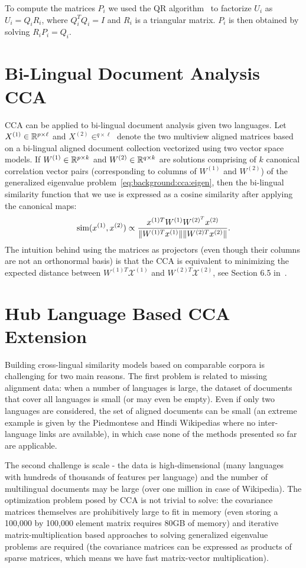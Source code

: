 To compute the matrices $P_i$ we used the QR algorithm~\cite{golub} to factorize
$U_i$ as $U_i = Q_i R_i$, where $Q_i^TQ_i = I$ and $R_i$ is a triangular matrix.
$P_i$ is then obtained by solving $R_i P_i = Q_i$.

\section{Bi-Lingual Document Analysis CCA}\label{chap:crosslingual:CCA}
CCA can be applied to bi-lingual document analysis given two languages. Let $X^{(1)} \in \mathbb{R}^{p \times \ell}$
and $X^{(2)} \in ^{q \times \ell}$ denote the two multiview aligned matrices based on a bi-lingual aligned
document collection vectorized using two vector space models.
If $W^{(1)}\in \mathbb{R}^{p\times k}$ and $W^{(2)} \in \mathbb{R}^{q\times k}$ are solutions comprising of $k$ canonical
correlation vector pairs (corresponding to columns of $W^{(1)}$ and $W^{(2)}$)
of the generalized eigenvalue problem~\ref{eq:background:cca:eigen}, then
the bi-lingual similarity function that we use is expressed as a cosine similarity
after applying the canonical maps:
$$\textnormal{sim}(x^{(1)}, x^{(2)}) \propto \frac{x^{(1)T} W^{(1)}W^{(2)^T}x^{(2)}}{\lVert W^{(1)T}x^{(1)}\rVert \lVert W^{(2)T}x^{(2)}\rVert} .$$
The intuition behind using the matrices as projectors (even though their columns are not an
orthonormal basis) is that the CCA is equivalent to minimizing the expected
distance between $W^{(1)T}\mathcal{X}^{(1)}$ and $W^{(2)T}\mathcal{X}^{(2)}$,
see Section 6.5 in~\cite{shawe-taylor04kernel}.


\section{Hub Language Based CCA Extension}\label{chap:crosslingual:hublang}
Building cross-lingual similarity models based on comparable corpora is challenging for
two main reasons. The first problem is related to missing alignment data: when a number
of languages is large, the dataset of documents that cover all languages is small (or may
even be empty). Even if only two languages are considered, the set of aligned documents
can be small (an extreme example is given by the Piedmontese and Hindi Wikipedias where
no inter-language links are available), in which case none of the methods presented so
far are applicable.

The second challenge is scale - the data is high-dimensional (many languages with
hundreds of thousands of features per language) and the number of multilingual documents may
be large (over one million in case of Wikipedia). The optimization problem posed by CCA is not trivial
to solve: the covariance matrices themselves are prohibitively
large to fit in memory (even storing a 100,000 by 100,000 element matrix requires
80GB of memory) and iterative matrix-multiplication based approaches to solving generalized
eigenvalue problems are required (the covariance matrices can be expressed as products
of sparse matrices, which means we have fast matrix-vector multiplication).

